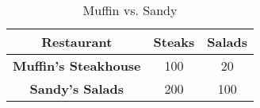 \begin{table}[h]
  \centering
  \begin{tabular}{|c|c|c|}
    \hline
    \textbf{Restaurant} & \textbf{Steaks} & \textbf{Salads} \\
    \hline
    \textbf{Muffin's Steakhouse} & 100 & 20 \\
    \hline
    \textbf{Sandy's Salads} & 200 & 100 \\
    \hline
  \end{tabular}
  \caption{Muffin vs. Sandy}
\end{table}